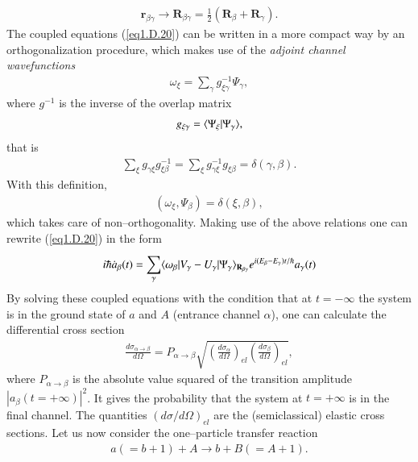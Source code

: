 \begin{subappendices}
\begin{align}\label{eq1.D.21}
\mathbf r_{\beta\gamma}\rightarrow\mathbf R_{\beta\gamma}=\frac{1}{2}(\mathbf R_\beta+\mathbf R_\gamma).
\end{align}
The coupled equations (\ref{eq1.D.20}) can be written in a more compact way by an orthogonalization procedure, which makes use of the \textit{adjoint channel wavefunctions}
\begin{align}\label{eq1.D.22}
\omega_\xi=\sum_{\gamma}g^{-1}_{\xi\gamma}\Psi_\gamma,
\end{align}
where $g^{-1}$ is the inverse of the overlap matrix
\begin{align}\label{eq1.D.23}
g_{\xi\gamma}=\langle {\Psi_\xi|\Psi_\gamma} \rangle,
\end{align}
that is
\begin{align}\label{eq1.D.24}
\sum_{\xi}g_{\gamma\xi}g^{-1}_{\xi\beta}=\sum_{\xi}^{}g^{-1}_{\gamma\xi}g_{\xi\beta}=\delta(\gamma,\beta).
\end{align}
With this definition,
\begin{align}\label{eq1.D.25}
(\omega_\xi,\Psi_\beta)=\delta(\xi,\beta),
\end{align}
which takes care of non--orthogonality. Making use of the above relations one can rewrite (\ref{eq1.D.20}) in the form
\begin{align}\label{eq1.D.26}
i\hbar \dot a_\beta(t)=\sum_{\gamma}^{}\langle {\omega_\beta|V_\gamma-U_\gamma|\Psi_\gamma} \rangle_{\mathbf R_{\beta\gamma}}e^{i(E_\beta-E_\gamma)t/\hbar}a_\gamma(t)
\end{align}
 By solving these coupled equations with the condition that at $t=-\infty$ the system is in the ground state of $a$ and $A$ (entrance channel $\alpha$), one can calculate the differential cross section
 \begin{align}\label{eq1.D.27}
 \frac{d\sigma_{\alpha\rightarrow\beta}}{d\Omega}=P_{\alpha\rightarrow\beta}\sqrt{\left(\frac{d\sigma_\alpha}{d\Omega}\right)_{el}\left(\frac{d\sigma_\beta}{d\Omega}\right)_{el}},
 \end{align}
 where $P_{\alpha\rightarrow\beta}$ is the absolute value squared of the transition amplitude $|a_{\beta}(t=+\infty)|^2$. It gives the probability that the system at $t=+\infty$ is in the final channel. The quantities $(d\sigma/d\Omega)_{el}$ are the (semiclassical) elastic cross sections. Let us now consider the one--particle transfer reaction
  \begin{align}\label{eq1.D.28}
a(=b+1)+A\rightarrow b+B(=A+1).
  \end{align}

\end{subappendices}

